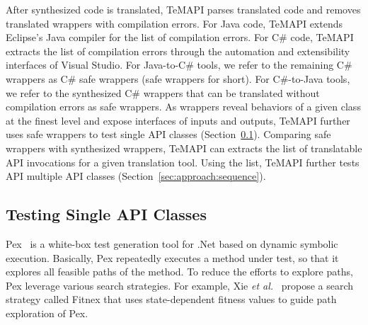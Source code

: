 After synthesized code is translated, TeMAPI parses translated code and removes translated wrappers with compilation errors. For Java code, TeMAPI extends Eclipse's Java compiler for the list of compilation errors. For C\# code, TeMAPI extracts the list of compilation errors through the automation and extensibility interfaces of Visual Studio. For Java-to-C\# tools, we refer to the remaining C\# wrappers as C\# safe wrappers (safe wrappers for short). For C\#-to-Java tools, we refer to the synthesized C\# wrappers that can be translated without compilation errors as safe wrappers. As wrappers reveal behaviors of a given class at the finest level and expose interfaces of inputs and outputs, TeMAPI further uses safe wrappers to test single API classes (Section~\ref{sec:approach:single}). Comparing safe wrappers with synthesized wrappers, TeMAPI can extracts the list of translatable API invocations for a given translation tool. Using the list, TeMAPI further tests API multiple API classes (Section~\ref{sec:approach:sequence}).


%


\subsection{Testing Single API Classes}
\label{sec:approach:single}

Pex~\cite{tillmann2008pex} is a white-box test generation tool for .Net based on dynamic symbolic execution. Basically, Pex repeatedly executes a method under test, so that it explores all feasible paths of the method. To reduce the efforts to explore paths, Pex leverage various search strategies. For example, Xie \emph{et al.}~\cite{xie09:fitness} propose a search strategy called Fitnex that uses state-dependent fitness values to guide path exploration of Pex.

